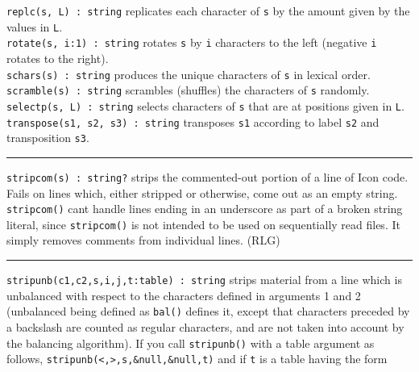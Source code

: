 \texttt{replc(s, L) : string} replicates each character of \texttt{s} by
the amount given by the values in \texttt{L}.\\
\texttt{rotate(s, i:1) : string} rotates \texttt{s} by \texttt{i}
characters to the left (negative \texttt{i} rotates to the
right).\\
\texttt{schars(s) : string} produces the unique characters of \texttt{s}
in lexical order.\\
\texttt{scramble(s) : string} scrambles (shuffles) the characters of
\texttt{s} randomly.\\
\texttt{selectp(s, L) : string} selects characters of \texttt{s} that
are at positions given in \texttt{L}.\\
\texttt{transpose(s1, s2, s3) : string} transposes \texttt{s1} according
to label \texttt{s2} and transposition \texttt{s3}.

\vspace{0.25cm}\hrule{}

\texttt{stripcom(s) : string?} strips the commented-out portion of a
line of Icon code. Fails on lines which, either stripped or otherwise,
come out as an empty string. \texttt{stripcom()} can{\textquotesingle}t
handle lines ending in an underscore as part of a broken string
literal, since \texttt{stripcom()} is not intended to be used on
sequentially read files. It simply removes comments from
individual lines. (RLG)

\vspace{0.25cm}\hrule{}

\texttt{stripunb(c1,c2,s,i,j,t:table) : string} strips material from a
line which is unbalanced with respect to the characters defined in
arguments 1 and 2 (unbalanced being defined as \texttt{bal()} defines
it, except that characters preceded by a backslash are counted as
regular characters, and are not taken into account by the balancing
algorithm). If you call \texttt{stripunb()} with a table argument as
follows,
\texttt{stripunb({\textquotesingle}{\textless}{\textquotesingle},{\textquotesingle}{\textgreater}{\textquotesingle},s,\&null,\&null,t)}
and if \texttt{t} is a table having the form

\iconcode{
key: {\textquotedbl}bold{\textquotedbl} value:
outstr({\textquotedbl}{\textbackslash}e[2m{\textquotedbl},
{\textquotedbl}{\textbackslash}e1m{\textquotedbl})}

